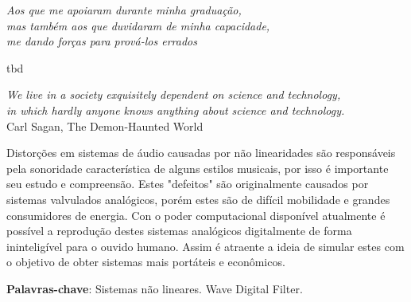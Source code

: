 
\begin{dedicatoria}
	\vspace*{\fill}
	\centering
	\noindent
	\textit{Aos que me apoiaram durante minha graduação, \\ mas também aos que duvidaram de minha capacidade, \\me dando forças para prová-los errados} \vspace*{\fill}
\end{dedicatoria}


\begin{agradecimentos}
tbd
\end{agradecimentos}


\begin{epigrafe}
	\vspace*{\fill}
	\begin{flushright} 
		\textit{We live in a society exquisitely dependent on science and technology,\\ in which hardly anyone knows anything about science and technology.}\\ \vspace{\onelineskip}
		Carl Sagan, The Demon-Haunted World
	\end{flushright}
\end{epigrafe}


\setlength{\absparsep}{18pt} %
\begin{resumo}
	Distorções em sistemas de áudio causadas por não linearidades são responsáveis pela sonoridade característica de alguns estilos musicais, por isso é importante seu estudo e compreensão. Estes "defeitos" são originalmente causados por sistemas valvulados analógicos, porém estes são de difícil mobilidade e grandes consumidores de energia. Con o poder computacional disponível atualmente é possível a reprodução destes sistemas analógicos digitalmente de forma ininteligível para o ouvido humano. Assim é atraente a ideia de simular estes com o objetivo de obter sistemas mais portáteis e econômicos.

	\vspace{\onelineskip}
	\textbf{Palavras-chave}: Sistemas não lineares. Wave Digital Filter.
\end{resumo}

